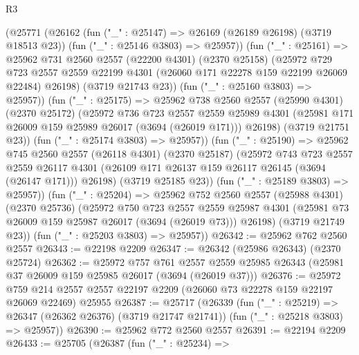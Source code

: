 \begin{lexlean}{R3}
\begin{coremodule}
          (@25771
            (@26162
              (fun ("_" : @25147) => @26169 (@26189 @26198) (@3719 @18513 @23))
              (fun ("_" : @25146 @3803) => @25957))
            (fun ("_" : @25161) =>
            @25962
              @731
              @2560
              @2557
              (@22200 @4301)
              (@2370 @25158)
              (@25972
                @729
                @723
                @2557
                @2559
                @22199
                @4301
                (@26060 @171 @22278 @159 @22199 @26069 @22484)
                @26198)
              (@3719 @21743 @23))
            (fun ("_" : @25160 @3803) => @25957))
          (fun ("_" : @25175) =>
          @25962
            @738
            @2560
            @2557
            (@25990 @4301)
            (@2370 @25172)
            (@25972
              @736
              @723
              @2557
              @2559
              @25989
              @4301
              (@25981 @171 @26009 @159 @25989 @26017 (@3694 (@26019 @171)))
              @26198)
            (@3719 @21751 @23))
          (fun ("_" : @25174 @3803) => @25957))
        (fun ("_" : @25190) =>
        @25962
          @745
          @2560
          @2557
          (@26118 @4301)
          (@2370 @25187)
          (@25972
            @743
            @723
            @2557
            @2559
            @26117
            @4301
            (@26109 @171 @26137 @159 @26117 @26145 (@3694 (@26147 @171)))
            @26198)
          (@3719 @25185 @23))
        (fun ("_" : @25189 @3803) => @25957))
      (fun ("_" : @25204) =>
      @25962
        @752
        @2560
        @2557
        (@25988 @4301)
        (@2370 @25736)
        (@25972
          @750
          @723
          @2557
          @2559
          @25987
          @4301
          (@25981 @73 @26009 @159 @25987 @26017 (@3694 (@26019 @73)))
          @26198)
        (@3719 @21749 @23))
      (fun ("_" : @25203 @3803) => @25957))
@26342 := @25962 @762 @2560 @2557
@26343 := @22198 @2209
@26347 := @26342 (@25986 @26343) (@2370 @25724)
@26362 := @25972
    @757
    @761
    @2557
    @2559
    @25985
    @26343
    (@25981 @37 @26009 @159 @25985 @26017 (@3694 (@26019 @37)))
@26376 := @25972
    @759
    @214
    @2557
    @2557
    @22197
    @2209
    (@26060 @73 @22278 @159 @22197 @26069 @22469)
    @25955
@26387 := @25717
    (@26339
      (fun ("_" : @25219) => @26347 (@26362 @26376) (@3719 @21747 @21741))
      (fun ("_" : @25218 @3803) => @25957))
@26390 := @25962 @772 @2560 @2557
@26391 := @22194 @2209
@26433 := @25705
    (@26387
      (fun ("_" : @25234) =>

\end{coremodule}
\end{lexlean}
